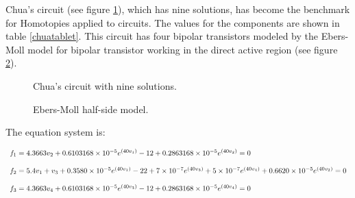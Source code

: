 \documentclass[conference,letterpaper,onecolumn]{IEEEtran}
\begin{document}
Chua's circuit (see figure \ref{chua}), which has nine solutions, has become the benchmark for Homotopies applied to circuits. The values for the components are shown in table \ref{chuatablet}. This circuit has four bipolar transistors modeled by the Ebers-Moll model for bipolar transistor working in the direct active region (see figure \ref{eber}).

\begin{table}[hbtp]
\caption{Chua's circuit component values.}
\label{chuatablet}
\end{table}

\begin{figure}[hbtp]
\centerline{
\epsfxsize=70mm
}
\caption{Chua's circuit with nine solutions.}
\label{chua}
\end{figure}

\begin{figure}[hbtp]
\centerline{
\epsfxsize=35mm
}
\caption{Ebers-Moll half-side model.}
\label{eber}
\end{figure}

The equation system is:

\begin{displaymath}
{\small
\begin{array}{l}
f_1=4.3663v_2+0.6103168 \times 10^{-5} e^{(40v_1)}-12+0.2863168\times 10^{-5}e^{(40v_2)}=0 \\ \\
f_2=5.4v_1+v_3+0.3580\times 10^{-5}e^{(40v_1)}-22+7\times 10^{-7}e^{(40v_3)}+  5\times 10^{-7}e^{(40v_4)}+0.6620\times 10^{-5}e^{(40v_2)}=0 \\ \\
f_3=4.3663v_4+0.6103168\times 10^{-5}e^{(40v_3)}-12+0.2863168\times 10^{-5}e^{(40v_4)}=0 \\
\end{array}
}
\end{displaymath}
\end{document}
